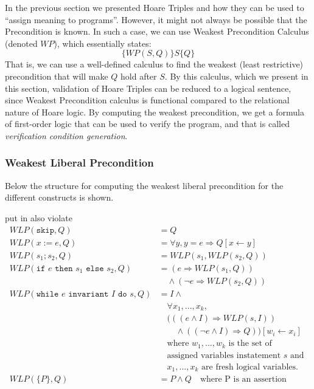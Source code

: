 

In the previous section we presented Hoare Triples and how they can be used to ``assign meaning to programs''. However, it might not always be possible that the Precondition is known. In such a case, we can use Weakest Precondition Calculus (denoted $WP$), which essentially states:
$$
 \{WP(S,Q)\}S\{Q\}
$$
That is, we can use a well-defined calculus to find the weakest (least restrictive) precondition that will make $Q$ hold after $S$. By this calculus, which we present in this section, validation of Hoare Triples can be reduced to a logical sentence, since Weakest Precondition calculus is functional compared to the relational nature of Hoare logic.
By computing the weakest precondition, we get a formula of first-order logic that can be used to verify the program, and that is called \textit{verification condition generation}.

\subsubsection{Weakest Liberal Precondition}
Below the structure for computing the weakest liberal precondition for the different constructs is shown.

put in also violate
\begin{align*}
	WLP(\texttt{skip}, Q) &= Q \\
	WLP(x:=e,Q) &= \forall y, y = e \Rightarrow Q[x \leftarrow y] \\
	WLP(s_1;s_2, Q) &= WLP(s_1, WLP(s_2, Q)) \\
	WLP(\texttt{if } e \texttt{ then } s_1 \texttt{ else } s_2, Q) &= (e \Rightarrow WLP(s_1, Q)) \\
		&\quad \land (\neg e \Rightarrow WLP(s_2, Q)) \\
	WLP(\texttt{while } e \texttt{ invariant } I \texttt{ do } s, Q) &= 
		I \land \\
    &\quad \forall x_1, ..., x_k, \\
    &\quad (((e \land I) \Rightarrow WLP(s, I)) \\
    &\quad \quad \land (( \neg e \land I) \Rightarrow Q))
       [w_i \leftarrow x_i] \\
	&\quad \text{where } w_1, ..., w_k \text{ is the set of} \\
  &\quad \text{assigned variables in} \text{statement } s \text{ and } \\
	&\quad x_1, ..., x_k \text{ are fresh logical variables.} \\
  WLP(\{P\}, Q) &= P \land Q \quad \text{where P is an assertion}
\end{align*}

